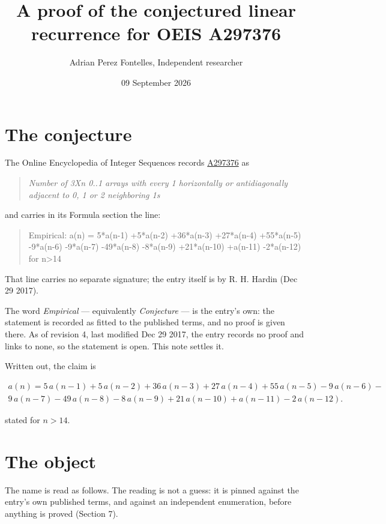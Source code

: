 \documentclass[11pt]{article}
\title{A proof of the conjectured linear recurrence for OEIS A297376}
\author{Adrian Perez Fontelles, Independent researcher}
\date{09 September 2026}
\theoremstyle{definition}
\begin{document}
\maketitle
\section{The conjecture}

The Online Encyclopedia of Integer Sequences records \href{https://oeis.org/A297376}{A297376} as

\begin{quote}\itshape Number of 3Xn 0..1 arrays with every 1 horizontally or antidiagonally adjacent to 0, 1 or 2 neighboring 1s\end{quote}

and carries in its Formula section the line:

\begin{quote}\ttfamily Empirical: a(n) = 5*a(n-1) +5*a(n-2) +36*a(n-3) +27*a(n-4) +55*a(n-5) -9*a(n-6) -9*a(n-7) -49*a(n-8) -8*a(n-9) +21*a(n-10) +a(n-11) -2*a(n-12) for n>14\end{quote}

That line carries no separate signature; the entry itself is by R. H. Hardin (Dec 29 2017).

The word {\itshape Empirical} --- equivalently {\itshape Conjecture} --- is the entry's own: the statement is recorded as fitted to the published terms, and no proof is given there. As of revision 4, last modified Dec 29 2017, the entry records no proof and links to none, so the statement is open. This note settles it.

Written out, the claim is

\begin{multline*} a(n) = 5\,a(n-1) + 5\,a(n-2) + 36\,a(n-3) + 27\,a(n-4) + 55\,a(n-5) - 9\,a(n-6) - \\ 9\,a(n-7) - 49\,a(n-8) - 8\,a(n-9) + 21\,a(n-10) + a(n-11) - 2\,a(n-12). \end{multline*}

stated for $n > 14$.

\section{The object}

The name is read as follows. The reading is not a guess: it is pinned against the entry's own published terms, and against an independent enumeration, before anything is proved (Section 7).
\end{document}
